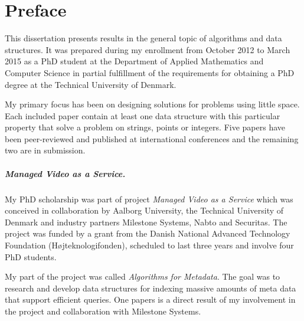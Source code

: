 \chapter{Preface}
This dissertation presents results in the general topic of algorithms and data structures. 
It was prepared during my enrollment from October 2012 to March 2015 as a PhD student at the Department of Applied Mathematics and Computer Science in partial fulfillment of the requirements for obtaining a PhD degree at the Technical University of Denmark.

My primary focus has been on designing solutions for problems using little space. Each included paper contain at least one data structure with this particular property that solve a problem on strings, points or integers.
Five papers have been peer-reviewed and published at international conferences and the remaining two are in submission.


\paragraph{Managed Video as a Service.}
My PhD scholarship was part of project \emph{Managed Video as a Service} which was conceived in collaboration by Aalborg University, the Technical University of Denmark and industry partners Milestone Systems, Nabto and Securitas. The project was funded by a grant from the Danish National Advanced Technology Foundation (H{\o}jteknologifonden), scheduled to last three years and involve four PhD students.

My part of the project was called \emph{Algorithms for Metadata}. The goal was to research and develop data structures for indexing massive amounts of meta data that support efficient queries. One papers is a direct result of my involvement in the project and collaboration with Milestone Systems. %


